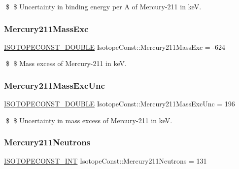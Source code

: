 \$ \$ Uncertainty in binding energy per A of Mercury-\/211 in keV. \mbox{\label{group___isotope_const-_mercury-_hg211_gad26f773412f67e03adbcc51649f78b9a}} 
\subsubsection{\texorpdfstring{Mercury211\+Mass\+Exc}{Mercury211MassExc}}
{\footnotesize\ttfamily \mbox{\hyperlink{group___isotope_const-_macros_ga8f45a7272ce02c0b4c65c44636ed719a}{I\+S\+O\+T\+O\+P\+E\+C\+O\+N\+S\+T\+\_\+\+D\+O\+U\+B\+LE}} Isotope\+Const\+::\+Mercury211\+Mass\+Exc = -\/624}

\$ \$ Mass excess of Mercury-\/211 in keV. \mbox{\label{group___isotope_const-_mercury-_hg211_ga3f533edc3bb0cbd0b97fa7a743a0e176}} 
\subsubsection{\texorpdfstring{Mercury211\+Mass\+Exc\+Unc}{Mercury211MassExcUnc}}
{\footnotesize\ttfamily \mbox{\hyperlink{group___isotope_const-_macros_ga8f45a7272ce02c0b4c65c44636ed719a}{I\+S\+O\+T\+O\+P\+E\+C\+O\+N\+S\+T\+\_\+\+D\+O\+U\+B\+LE}} Isotope\+Const\+::\+Mercury211\+Mass\+Exc\+Unc = 196}

\$ \$ Uncertainty in mass excess of Mercury-\/211 in keV. \mbox{\label{group___isotope_const-_mercury-_hg211_ga2bfdcd700119159cb37035f6fdf00fdb}} 
\subsubsection{\texorpdfstring{Mercury211\+Neutrons}{Mercury211Neutrons}}
{\footnotesize\ttfamily \mbox{\hyperlink{group___isotope_const-_macros_ga5f18360b3e99483a35c32d789e62621c}{I\+S\+O\+T\+O\+P\+E\+C\+O\+N\+S\+T\+\_\+\+I\+NT}} Isotope\+Const\+::\+Mercury211\+Neutrons = 131}

